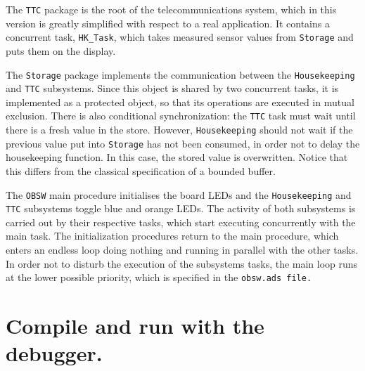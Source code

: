 The {\tt TTC} package is the root of the telecommunications system, which in this version is greatly simplified with respect to a real application. It contains a concurrent task, {\tt HK\_Task}, which takes measured sensor values from {\tt Storage} and puts them on the display.

The {\tt Storage} package implements the communication between the {\tt Housekeeping} and {\tt TTC} subsystems.  Since this object is shared by two concurrent tasks, it is implemented as a protected object, so that its operations are executed in mutual exclusion. There is also conditional synchronization: the {\tt TTC} task must wait until there is a fresh value in the store. However, {\tt Housekeeping} should not wait if the previous value put into {\tt Storage} has not been consumed, in order not to delay the housekeeping function. In this case, the stored value is overwritten. Notice that this differs from the classical specification of a bounded buffer.

The {\tt OBSW} main procedure initialises the board LEDs and the {\tt Housekeeping} and {\tt TTC} subsystems toggle blue and orange LEDs.  The activity of both subsystems is carried out by their respective tasks, which start executing concurrently with the main task. The initialization procedures return to the main procedure, which enters an endless loop doing nothing and running in parallel with the other tasks. In order not to disturb the execution of the subsystems tasks, the main loop runs at the lower possible priority, which is specified in the {\tt obsw.ads file.}

\section{Compile and run with the debugger.}

